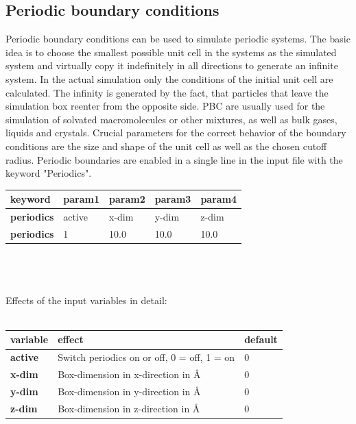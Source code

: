 \documentclass[10pt,a4paper]{article} %
\newif\ifdevelopment %
\begin{document}
	\subsection{Periodic boundary conditions}
	Periodic boundary conditions can be used to simulate periodic systems. The basic idea is to choose the smallest possible unit cell in the systems as the simulated system and virtually copy it indefinitely in all directions to generate an infinite system. In the actual simulation only the conditions of the initial unit cell are calculated. The infinity is generated by the fact, that particles that leave the simulation box reenter from the opposite side. \acf{PBC} are usually used for the simulation of solvated macromolecules or other mixtures, as well as bulk gases, liquids and crystals. Crucial parameters for the correct behavior of the boundary conditions are the size and shape of the unit cell as well as the chosen cutoff radius. Periodic boundaries are enabled in a single line in the input file with the keyword "Periodics".\\
	\begin{tabularx}{\textwidth}{l|X|X|X|X}
		\textbf{keyword} & param1 & param2 & param3 & param4 \\
		\hline
		\textbf{periodics} & active & x-dim & y-dim & z-dim \\
		\textbf{periodics} & 1 & 10.0 & 10.0 & 10.0 \\
	\end{tabularx}\\~\\~\\
	Effects of the input variables in detail:\\~\\
	\begin{tabularx}{\textwidth}{l|X|X}
		\textbf{variable} & effect & default \\
		\hline
		\textbf{active} & Switch periodics on or off, 0 = off, 1 = on & 0 \\
		\textbf{x-dim} & Box-dimension in x-direction in \AA & 0 \\
		\textbf{y-dim} & Box-dimension in y-direction in \AA & 0 \\
		\textbf{z-dim} & Box-dimension in z-direction in \AA & 0 \\
	\end{tabularx}~\\

	\ifdevelopment
	\newpage
\end{document}
